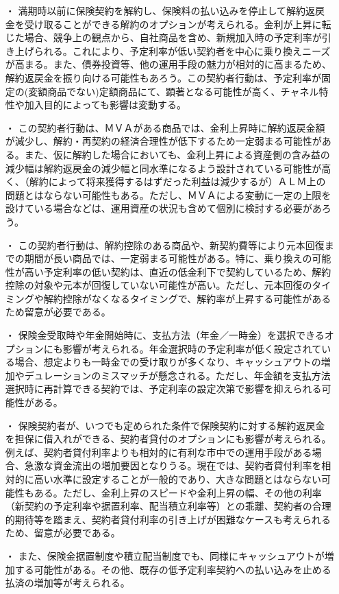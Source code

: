 \documentclass[report,gutter=10mm,fore-edge=10mm,uplatex,dvipdfmx]{jlreq}
\begin{document}
\begin{itemize}
 \item [・]  満期時以前に保険契約を解約し、保険料の払い込みを停止して解約返戻金を受け取ることができる解約のオプションが考えられる。金利が上昇に転じた場合、競争上の観点から、自社商品を含め、新規加入時の予定利率が引き上げられる。これにより、予定利率が低い契約者を中心に乗り換えニーズが高まる。また、債券投資等、他の運用手段の魅力が相対的に高まるため、解約返戻金を振り向ける可能性もあろう。この契約者行動は、予定利率が固定の(変額商品でない)定額商品にて、顕著となる可能性が高く、チャネル特性や加入目的によっても影響は変動する。
 \item [・]  この契約者行動は、ＭＶＡがある商品では、金利上昇時に解約返戻金額が減少し、解約・再契約の経済合理性が低下するため一定弱まる可能性がある。また、仮に解約した場合においても、金利上昇による資産側の含み益の減少幅は解約返戻金の減少幅と同水準になるよう設計されている可能性が高く、（解約によって将来獲得するはずだった利益は減少するが）ＡＬＭ上の問題とはならない可能性もある。ただし、ＭＶＡによる変動に一定の上限を設けている場合などは、運用資産の状況も含めて個別に検討する必要があろう。
 \item [・]  この契約者行動は、解約控除のある商品や、新契約費等により元本回復までの期間が長い商品では、一定弱まる可能性がある。特に、乗り換えの可能性が高い予定利率の低い契約は、直近の低金利下で契約しているため、解約控除の対象や元本が回復していない可能性が高い。ただし、元本回復のタイミングや解約控除がなくなるタイミングで、解約率が上昇する可能性があるため留意が必要である。
 \item [・]  保険金受取時や年金開始時に、支払方法（年金／一時金）を選択できるオプションにも影響が考えられる。年金選択時の予定利率が低く設定されている場合、想定よりも一時金での受け取りが多くなり、キャッシュアウトの増加やデュレーションのミスマッチが懸念される。ただし、年金額を支払方法選択時に再計算できる契約では、予定利率の設定次第で影響を抑えられる可能性がある。
 \item [・]  保険契約者が、いつでも定められた条件で保険契約に対する解約返戻金を担保に借入れができる、契約者貸付のオプションにも影響が考えられる。例えば、契約者貸付利率よりも相対的に有利な市中での運用手段がある場合、急激な資金流出の増加要因となりうる。現在では、契約者貸付利率を相対的に高い水準に設定することが一般的であり、大きな問題とはならない可能性もある。ただし、金利上昇のスピードや金利上昇の幅、その他の利率（新契約の予定利率や据置利率、配当積立利率等）との乖離、契約者の合理的期待等を踏まえ、契約者貸付利率の引き上げが困難なケースも考えられるため、留意が必要である。
 \item [・]  また、保険金据置制度や積立配当制度でも、同様にキャッシュアウトが増加する可能性がある。その他、既存の低予定利率契約への払い込みを止める払済の増加等が考えられる。
\end{itemize}
\end{document}
